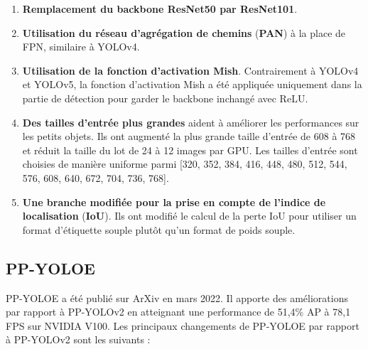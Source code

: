 \documentclass{article}
\begin{document}
\begin{enumerate}
    \item \textbf{Remplacement du backbone ResNet50 par ResNet101}.
    \item \textbf{Utilisation du réseau d'agrégation de chemins} (\textbf{PAN}) à la place de FPN, similaire à YOLOv4.
    \item \textbf{Utilisation de la fonction d'activation Mish}. Contrairement à YOLOv4 et YOLOv5, la fonction d'activation Mish a été appliquée uniquement dans la partie de détection pour garder le backbone inchangé avec ReLU.
    \item \textbf{Des tailles d'entrée plus grandes} aident à améliorer les performances sur les petits objets. Ils ont augmenté la plus grande taille d'entrée de 608 à 768 et réduit la taille du lot de 24 à 12 images par GPU. Les tailles d'entrée sont choisies de manière uniforme parmi [320, 352, 384, 416, 448, 480, 512, 544, 576, 608, 640, 672, 704, 736, 768].
    \item \textbf{Une branche modifiée pour la prise en compte de l'indice de localisation} (\textbf{IoU}). Ils ont modifié le calcul de la perte IoU pour utiliser un format d'étiquette souple plutôt qu'un format de poids souple.
\end{enumerate}

\subsection{PP-YOLOE}
PP-YOLOE \cite{106} a été publié sur ArXiv en mars 2022. Il apporte des améliorations par rapport à PP-YOLOv2 en atteignant une performance de 51,4\% AP à 78,1 FPS sur NVIDIA V100. Les principaux changements de PP-YOLOE par rapport à PP-YOLOv2 sont les suivants :
\end{document}
